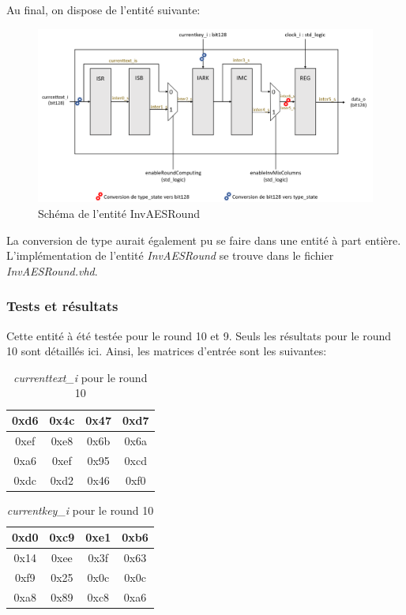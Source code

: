 \documentclass[a4paper, 12pt]{article}
\begin{document}
Au final, on dispose de l'entité suivante:
			\begin{figure}[H]
				\begin{center}
				\includegraphics[scale=0.43]{Images/InvAESRoundEntity.png}
				\end{center}
				\caption{Schéma de l'entité InvAESRound}
				\label{InvAESRoundEntity}
			\end{figure}
			
La conversion de type aurait également pu se faire dans une entité à part entière.
	L'implémentation de l'entité \emph{InvAESRound} se trouve dans le fichier \emph{InvAESRound.vhd}.

		\subsubsection{Tests et résultats}
Cette entité à été testée pour le round 10 et 9. Seuls les résultats pour le round 10 sont détaillés ici. Ainsi, les matrices d'entrée sont les suivantes:
			\begin{table}[H]
				\begin{center}
				\begin{tabular}{|c|c|c|c|}
					\hline
					0xd6 & 0x4c & 0x47 & 0xd7 \\
					\hline
					0xef & 0xe8 & 0x6b & 0x6a \\
					\hline
					0xa6 & 0xef & 0x95 & 0xcd \\
					\hline
					0xdc & 0xd2 & 0x46 & 0xf0 \\
					\hline
				\end{tabular}
				\caption{\emph{currenttext\_i} pour le round 10}
				\label{CurrenttextRound10}
				\end{center}
			\end{table}
			
			\begin{table}[H]
				\begin{center}
				\begin{tabular}{|c|c|c|c|}
					\hline
					0xd0 & 0xc9 & 0xe1 & 0xb6 \\
					\hline
					0x14 & 0xee & 0x3f & 0x63 \\
					\hline
					0xf9 & 0x25 & 0x0c & 0x0c \\
					\hline
					0xa8 & 0x89 & 0xc8 & 0xa6 \\
					\hline
				\end{tabular}
				\caption{\emph{currentkey\_i} pour le round 10}
				\label{CurrentKeyRound10}
				\end{center}
			\end{table}
			
\end{document}
